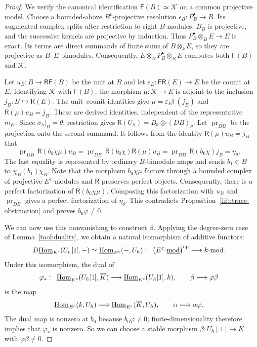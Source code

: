 \documentclass[11pt]{article}
\begin{document}
\begin{proof}
We verify the canonical identification $\mathsf F(B)\simeq \mathcal K$ on a common projective model. Choose a bounded-above $B^e$-projective resolution $\epsilon_B:P_B^\bullet\to B$. Its augmented complex splits after restriction to right $B$-modules: $B_B$ is projective, and the successive kernels are projective by induction. Thus $P_B^\bullet\otimes_BE\to E$ is exact. Its terms are direct summands of finite sums of $B\otimes_kE$, so they are projective as $B$--$E$-bimodules. Consequently, $E\otimes_BP_B^\bullet\otimes_BE$ computes both $\mathsf F(B)$ and $\mathcal K$.

Let $u_B:B\to\mathsf R\mathsf F(B)$ be the unit at $B$ and let $\varepsilon_E:\mathsf F\mathsf R(E)\to E$ be the counit at $E$. Identifying $\mathcal K$ with $\mathsf F(B)$, the morphism
$\mu:\mathcal K\to E$ is adjoint to the inclusion
$j_B:B\hookrightarrow\mathsf R(E)$. The unit--counit identities give
$\mu=\varepsilon_E\mathsf F(j_B)$ and $\mathsf R(\mu)u_B=j_B$.
These are derived identities, independent of the representative $m_K$.
Since $\sigma_h|_B=\theta$, restriction gives $\mathsf R(U_h)=B_\theta\oplus(DB)_\theta$.
Let $\operatorname{pr}_{DB}$ be the projection onto the second
summand. It follows from the identity $\mathsf R(\mu)u_B=j_B$ that
\[
 \operatorname{pr}_{DB}\,
 \mathsf R(b_0\chi\mu)u_B= \operatorname{pr}_{DB}\,
 \mathsf R(b_0\chi) \mathsf R(\mu)u_B
 =\operatorname{pr}_{DB}\,\mathsf R(b_0\chi)j_B
 =\eta_\theta.
\]
The last equality is represented by ordinary $B$-bimodule maps and sends
$b_1\in B$ to $\chi_B(b_1)\chi_B$.
Note that the morphism $b_0\chi\mu$ factors through a bounded complex of projective $E^e$-modules
and $\mathsf R$ preserves perfect objects. Consequently, there is a perfect factorization of
$\mathsf R(b_0\chi\mu)$. Composing this factorization with $u_B$ and $\operatorname{pr}_{DB}$ gives a perfect
factorization of $\eta_\theta$. This contradicts Proposition~\ref{lift:trace-obstruction} and proves
$b_0\varphi\ne0$.

We can now use this nonvanishing to construct $\beta$.
Applying the degree-zero case of Lemma~\ref{tool:duality},
we obtain a natural isomorphism of additive functors:
\[
 D\underline{{\rm Hom}}_{E^e}(U_h[1], -)
       \simeq\underline{{\rm Hom}}_{E^e}(-,U_h):\;\;
       \bigl(E^e\text{-}\underline{\mathrm{mod}}\bigr)^{\mathrm{op}}\longrightarrow k\mbox{{\rm -mod}}.
\]
Under this isomorphism, the dual of
\[
 \varphi_*:\;\;\underline{{\rm Hom}}_{E^e}(U_h[1],\overline K)
        \longrightarrow\underline{{\rm Hom}}_{E^e}(U_h[1],k),
 \qquad \beta\longmapsto\varphi\beta
\]
is the map
\[
 \underline{{\rm Hom}}_{E^e}(k,U_h)
       \longrightarrow\underline{{\rm Hom}}_{E^e}(\overline K,U_h),
 \qquad \alpha\longmapsto \alpha\varphi.
\]
The dual map is nonzero at $b_0$ because
$b_0\varphi\ne0$; finite-dimensionality therefore
implies that $\varphi_*$ is nonzero. So we can choose a stable morphism
$\beta:U_h[1]\to \overline K$ with $\varphi\beta\ne0$.


\end{proof}
\end{document}
